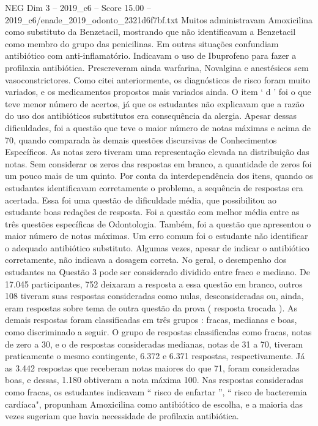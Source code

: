 \begin{textsample}{NEG Dim 3 – 2019\_c6 – Score 15.00 – 2019\_c6/enade\_2019\_odonto\_2321d6f7bf.txt}
Muitos administravam Amoxicilina como substituto da Benzetacil, mostrando que não identificavam a Benzetacil como membro do grupo das penicilinas.
Em outras situações confundiam antibiótico com anti-inflamatório.
Indicavam o uso de Ibuprofeno para fazer a profilaxia antibiótica.
Prescreveram ainda warfarina, Novalgina e anestésicos sem vasoconstrictores.
Como citei anteriormente, os diagnósticos de risco foram muito variados, e os medicamentos propostos mais variados ainda.
O item ‘ d ’ foi o que teve menor número de acertos, já que os estudantes não explicavam que a razão do uso dos antibióticos substitutos era consequência da alergia.
Apesar dessas dificuldades, foi a questão que teve o maior número de notas máximas e acima de 70, quando comparada às demais questões discursivas de Conhecimentos Específicos.
As notas zero tiveram uma representação elevada na distribuição das notas.
Sem considerar os zeros das respostas em branco, a quantidade de zeros foi um pouco mais de um quinto.
Por conta da interdependência dos itens, quando os estudantes identificavam corretamente o problema, a sequência de respostas era acertada.
Essa foi uma questão de dificuldade média, que possibilitou ao estudante boas redações de resposta.
Foi a questão com melhor média entre as três questões específicas de Odontologia.
Também, foi a questão que apresentou o maior número de notas máximas.
Um erro comum foi o estudante não identificar o adequado antibiótico substituto.
Algumas vezes, apesar de indicar o antibiótico corretamente, não indicava a dosagem correta.
No geral, o desempenho dos estudantes na Questão 3 pode ser considerado dividido entre fraco e mediano.
De 17.045 participantes, 752 deixaram a resposta a essa questão em branco, outros 108 tiveram suas respostas consideradas como nulas, desconsideradas ou, ainda, eram respostas sobre tema de outra questão da prova ( resposta trocada ).
As demais respostas foram classificadas em três grupos : fracas, medianas e boas, como discriminado a seguir.
O grupo de respostas classificadas como fracas, notas de zero a 30, e o de respostas consideradas medianas, notas de 31 a 70, tiveram praticamente o mesmo contingente, 6.372 e 6.371 respostas, respectivamente.
Já as 3.442 respostas que receberam notas maiores do que 71, foram consideradas boas, e dessas, 1.180 obtiveram a nota máxima 100.
Nas respostas consideradas como fracas, os estudantes indicavam “ risco de enfartar ”, “ risco de bacteremia cardíaca", propunham Amoxicilina como antibiótico de escolha, e a maioria das vezes sugeriam que havia necessidade de profilaxia antibiótica.

\end{textsample}
